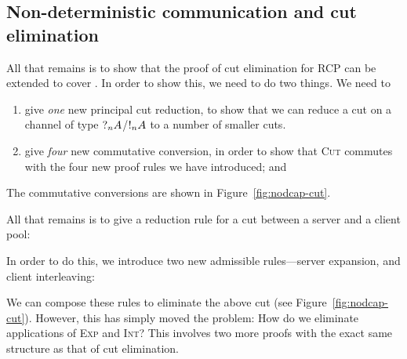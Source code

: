 \documentclass[a4paper,UKenglish]{lipics-v2016}
\begin{document}
\subsection*{Non-deterministic communication and cut elimination}
All that remains is to show that the proof of cut elimination for RCP can be
extended to cover \nodcap. In order to show this, we need to do two things.
We need to
\begin{enumerate}
\item
  give \emph{one} new principal cut reduction, to show that we can reduce a cut
  on a channel of type $\give[n]{A}$/$\take[n]{A}$ to a number of smaller cuts.
\item
  give \emph{four} new commutative conversion, in order to show that
  \textsc{Cut} commutes with the four new proof rules we have introduced; and
\end{enumerate}
The commutative conversions are shown in Figure~\ref{fig:nodcap-cut}.
%

%
All that remains is to give a reduction rule for a cut between a server and a
client pool:
\begin{prooftree}
\end{prooftree}
In order to do this, we introduce two new admissible rules---server expansion,
and client interleaving:
\begin{center}
  \begin{scprooftree*}[0.90]
  \end{scprooftree*}%
  \begin{scprooftree*}[0.90]
  \end{scprooftree*}
\end{center}
We can compose these rules to eliminate the above cut (see
Figure~\ref{fig:nodcap-cut}).
%
However, this has simply moved the problem: How do we eliminate applications of
\textsc{Exp} and \textsc{Int}? This involves two more proofs with the exact same
structure as that of cut elimination.
\end{document}
